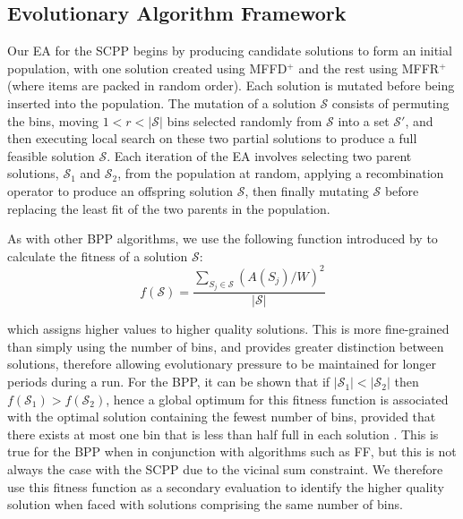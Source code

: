 \documentclass[authoryear]{elsarticle}
\begin{document}
\subsection{Evolutionary Algorithm Framework}
\label{sub:eaframework}
\noindent Our EA for the SCPP begins by producing candidate solutions to form an initial population, with one solution created using MFFD$^+$ and the rest using MFFR$^+$ (where items are packed in random order). Each solution is mutated before being inserted into the population. The mutation of a solution $\mathcal{S}$ consists of permuting the bins, moving $1 < r < |\mathcal{S}|$ bins selected randomly from $\mathcal{S}$ into a set $\mathcal{S}'$, and then executing local search on these two partial solutions to produce a full feasible solution $\mathcal{S}$. Each iteration of the EA involves selecting two parent solutions, $\mathcal{S}_1$ and $\mathcal{S}_2$, from the population at random, applying a recombination operator to produce an offspring solution $\mathcal{S}$, then finally mutating $\mathcal{S}$ before replacing the least fit of the two parents in the population.

As with other BPP algorithms, we use the following function introduced by \citet{falkenauer1992} to calculate the fitness of a solution $\mathcal{S}$:
\begin{equation}
f(\mathcal{S}) = \frac{\sum_{S_j \in \mathcal{S}} (A(S_j)/W)^2}{|\mathcal{S}|}
\label{eqn:fitness}
\end{equation}

\noindent which assigns higher values to higher quality solutions. This is more fine-grained than simply using the number of bins, and provides greater distinction between solutions, therefore allowing evolutionary pressure to be maintained for longer periods during a run. For the BPP, it can be shown that if $|\mathcal{S}_1| < |\mathcal{S}_2|$  then $f(\mathcal{S}_1) > f(\mathcal{S}_2)$, hence a global optimum for this fitness function is associated with the optimal solution containing the fewest number of bins, provided that there exists at most one bin that is less than half full in each solution \citep{falkenauer1998}. This is true for the BPP when in conjunction with algorithms such as FF, but this is not always the case with the SCPP due to the vicinal sum constraint. We therefore use this fitness function as a secondary evaluation to identify the higher quality solution when faced with solutions comprising the same number of bins.
\end{document}
